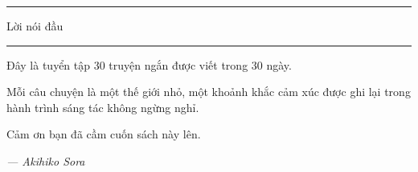 
\thispagestyle{empty}
\vspace*{2cm}

\begin{center}
    \textcolor{bunko_gray}{\rule{2cm}{0.3pt}}
    \vspace{0.5cm}
    
    {\titlefont\large Lời nói đầu}
    
    \vspace{0.5cm}
    \textcolor{bunko_gray}{\rule{2cm}{0.3pt}}
\end{center}

\vspace{1.5cm}

\noindent
Đây là tuyển tập 30 truyện ngắn được viết trong 30 ngày.

\vspace{0.5cm}

\noindent
Mỗi câu chuyện là một thế giới nhỏ, một khoảnh khắc cảm xúc được ghi lại trong hành trình sáng tác không ngừng nghỉ.

\vspace{0.5cm}

\noindent
Cảm ơn bạn đã cầm cuốn sách này lên.

\vspace{1cm}

\begin{flushright}
    \textit{--- Akihiko Sora}
\end{flushright}

\clearpage